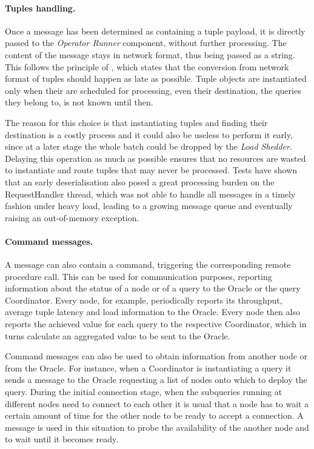 \paragraph{Tuples handling.}
Once a message has been determined as containing a tuple payload, it is directly passed to the
\emph{Operator Runner} component, without further processing. The content of the message stays in network
format, thus being passed as a string. This follows the principle of , which
states that the conversion from network format of tuples should happen as late as possible. Tuple
objects are instantiated only when their are scheduled for processing, even their destination, the
queries they belong to, is not known until then.
 
The reason for this choice is that instantiating tuples and finding their destination is a costly process
and it could also be useless to perform it early, since at a later stage the whole batch could be dropped
by the \emph{Load Shedder}. Delaying this operation as much as possible ensures that no resources are
wasted to instantiate and route tuples that may never be processed. Tests have shown that an early
deserialisation also posed a great processing burden on the RequestHandler thread, which was not able to
handle all messages in a timely fashion under heavy load, leading to a growing message queue and
eventually raising an out-of-memory exception.

\paragraph{Command messages.}
A message can also contain a command, triggering the corresponding remote procedure call. This can be
used for communication purposes, reporting information about the status of a node or of a query to the
Oracle or the query Coordinator. Every node, for example, periodically reports its throughput, average
tuple latency and load information to the Oracle. Every node then also reports the achieved \sic value
for each query to the respective Coordinator, which in turns calculate an aggregated value to be sent to
the Oracle. 

Command messages can also be used to obtain information from another node or from the Oracle. For
instance, when a Coordinator is instantiating a query it sends a message to the Oracle requesting a list
of nodes onto which to deploy the query. During the initial connection stage, when the subqueries running
at different nodes need to connect to each other it is usual that a node has to wait a certain amount of
time for the other node to be ready to accept a connection. A message is used in this situation to probe
the availability of the another node and to wait until it becomes ready.

